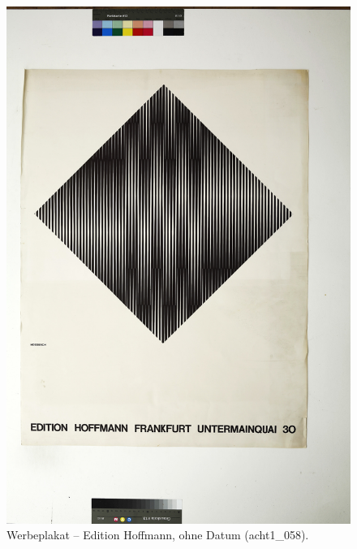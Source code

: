 \documentclass[a4paper,12pt,ngerman]{article}
\begin{document}
\newpage
\begin{figure}[ht]
\includegraphics[width=\linewidth]{Abbildung_34_(acht1_058)}
\centering
\caption{Werbeplakat -- Edition Hoffmann, ohne Datum (acht1\_058).}
\end{figure}
\end{document}
